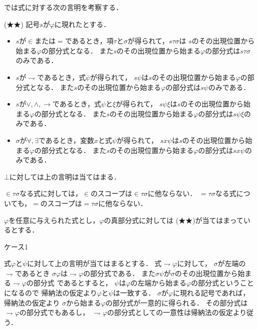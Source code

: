 \documentclass[a4j,10.5pt,oneside,openany]{jsbook}
\begin{document}
	では式に対する次の言明を考察する．
	
	\begin{screen}
		(★★) 記号$s$が$\varphi$に現れたとする．
		\begin{itemize}
			\item $s$が$\in$または$=$であるとき，項$\tau$と$\sigma$が得られて，$s \tau \sigma$は
				$s$のその出現位置から始まる$\varphi$の部分式となる．
				また$s$のその出現位置から始まる$\varphi$の部分式は$s \tau \sigma$のみである．
				
			\item $s$が$\rightharpoondown$であるとき，式$\psi$が得られて，
				$s \psi$は$s$のその出現位置から始まる$\varphi$の部分式となる．
				また$s$のその出現位置から始まる$\varphi$の部分式は$s \psi$のみである．
				
			\item $s$が$\vee,\wedge,\rightarrow$であるとき，式$\psi$と$\xi$が得られて，
				$s \psi \xi$は$s$のその出現位置から始まる$\varphi$の部分式となる．
				また$s$のその出現位置から始まる$\varphi$の部分式は$s \psi \xi$のみである．
				
			\item $\sigma$が$\forall, \exists$であるとき，変数$x$と式$\psi$が得られて，
				$s x \psi$は$s$のその出現位置から始まる$\varphi$の部分式となる．
				また$s$のその出現位置から始まる$\varphi$の部分式は$s x \psi$のみである．
		\end{itemize}
	\end{screen}
	
	$\bot$に対しては上の言明は当てはまる．
	
	$\in \tau \sigma$なる式に対しては，$\in$のスコープは$\in \tau \sigma$に他ならない．
	$= \tau \sigma$なる式についても，$=$のスコープは$= \tau \sigma$に他ならない．
	
	$\varphi$を任意に与えられた式とし，$\varphi$の真部分式に対しては
	(★★)が当てはまっているとする．
	
	\begin{description}
		\item[ケース1] 
	\end{description}
	式$\varphi$と$\psi$に対して上の言明が当てはまるとする．
	式$\rightharpoondown \varphi$に対して，
	$\sigma$が左端の$\rightharpoondown$であるとき
	$\sigma \varphi$は$\rightharpoondown \varphi$の部分式である．
	また$\sigma \psi$が$\sigma$のその出現位置から始まる$\rightharpoondown \varphi$の部分式
	であるとすると，
	$\psi$は$\varphi$の左端から始まる$\varphi$の部分式ということになるので
	帰納法の仮定より$\varphi$と$\psi$は一致する．
	$\sigma$が$\varphi$に現れる記号であれば，帰納法の仮定より
	$\sigma$から始まる$\varphi$の部分式が一意的に得られる．
	その部分式は$\rightharpoondown \varphi$の部分式でもあるし，
	$\rightharpoondown \varphi$の部分式としての一意性は帰納法の仮定より従う．
	
\end{document}
